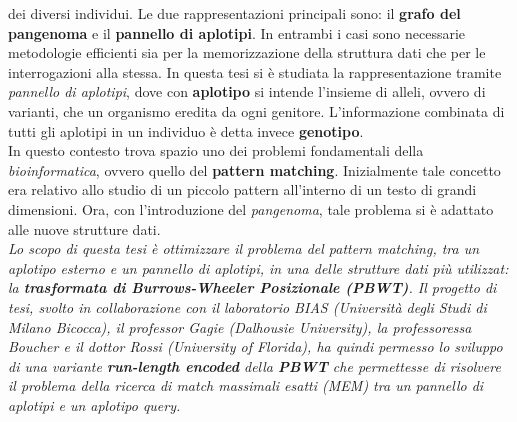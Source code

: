 \documentclass[a4paper,11pt, oneside,italian]{article}
\begin{document}
dei diversi individui. Le due rappresentazioni principali sono:
il \textbf{grafo del pangenoma} e il \textbf{pannello di
  aplotipi}. In entrambi i casi sono necessarie metodologie efficienti sia per
la memorizzazione della struttura dati che per le interrogazioni alla stessa. In
questa tesi si è studiata la rappresentazione
tramite \textit{pannello di aplotipi}, dove con \textbf{aplotipo} si intende
l'insieme di alleli, ovvero di varianti, che un organismo eredita da ogni
genitore. L'informazione combinata di tutti gli aplotipi in un individuo è detta
invece \textbf{genotipo}.\\
In questo contesto trova spazio uno dei problemi fondamentali
della \textit{bioinformatica}, ovvero quello del \textbf{pattern
  matching}. Inizialmente tale concetto era relativo allo studio di un piccolo
pattern all'interno di un testo di grandi dimensioni. Ora, con l'introduzione
del \textit{pangenoma}, tale problema si è adattato alle nuove strutture
dati.\\
\textit{Lo scopo di questa tesi è ottimizzare il problema del
  pattern 
matching, tra un aplotipo esterno e un pannello di aplotipi, in una delle
strutture dati più utilizzat: la \textbf{trasformata di Burrows-Wheeler
  Posizionale (\textit{PBWT})}. Il 
progetto di tesi, svolto in collaborazione con il laboratorio BIAS (Università
degli Studi di Milano Bicocca), il professor
Gagie (Dalhousie University), la professoressa Boucher e il dottor Rossi
(University of Florida), ha quindi permesso lo sviluppo di una variante
\textbf{run-length encoded} della \textbf{PBWT} che permettesse di risolvere il
problema della ricerca di match massimali esatti (MEM) tra un pannello di
aplotipi e 
un aplotipo query.}
\end{document}
